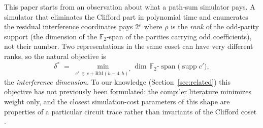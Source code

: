 \documentclass[11pt]{article}
\theoremstyle{definition}
\theoremstyle{remark}
\newcommand{\F}{\mathbb{F}_2}
\newcommand{\RM}{\mathrm{RM}}
\newcommand{\spn}{\operatorname{span}}
\newcommand{\supp}{\operatorname{supp}}
\newcommand{\ds}{\delta^{*}}
\begin{document}
This paper starts from an observation about what a path-sum simulator pays. A
simulator that eliminates the Clifford part in polynomial time \cite{Amy19} and enumerates the
residual interference coordinates pays $2^{\rho}$ where $\rho$ is the \emph{rank} of the odd-parity support (the
dimension of the $\F$-span of the parities carrying odd coefficients), not their number. Two
representations in the same coset can have very different ranks, so the natural objective is
\[
  \ds \;=\; \min_{c'\,\in\, c+\RM(h-4,h)^{*}} \dim\, \F\text{-}\spn\bigl(\supp c'\bigr),
\]
the \emph{interference dimension}. To our knowledge (Section~\ref{sec:related}) this objective has not previously
been formulated: the compiler literature minimizes weight only, and the closest simulation-cost
parameters of this shape are properties of a particular circuit trace rather than invariants of
the Clifford coset \cite{LC26,CL26a}.
\end{document}
